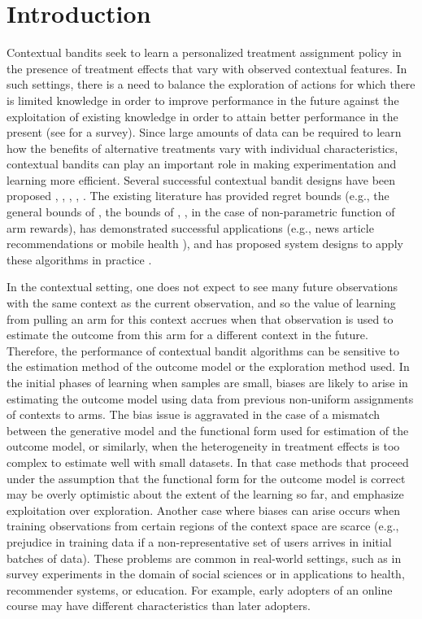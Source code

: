 \documentclass[letterpaper]{article} %
\begin{document}
\section{Introduction}
Contextual bandits seek to learn a personalized treatment assignment policy in the presence of treatment effects that vary with observed contextual features.
In such settings, there is a need to balance the exploration of actions for which there is limited knowledge in order to improve performance in the future against the exploitation of existing knowledge in order to attain better performance in the present (see \cite{bubeck2012regret} for a survey). 
Since large amounts of data can be required to learn how the benefits of alternative treatments vary with individual characteristics, contextual bandits can play an important role in making experimentation and learning more efficient.
Several successful contextual bandit designs have been proposed \cite{auer-linrel}, \cite{li-linucb}, \cite{agrawal-lints}, \cite{agarwal-ilovetoconbandits}, \cite{bastani2015online}. 
The existing literature has provided regret bounds (e.g., the general bounds of \cite{russo-vanroy}, the bounds of  \cite{rigollet-nonparamtheory}, \cite{perchet-nonparamtheory}, \cite{slivkins-nonparamtheory} in the case of non-parametric function of arm rewards), has demonstrated successful applications (e.g., news article recommendations \cite{li-linucb} or mobile health \cite{lei-mhealth}), and has proposed system designs to apply these algorithms in practice \cite{agarwal-debt}.

In the contextual setting, one does not expect to see many future observations with the same context as the current observation, and so the value of learning from pulling an arm for this context accrues when that observation is used to estimate the outcome from this arm for a different context in the future.
Therefore, the performance of contextual bandit algorithms can be sensitive to the estimation method of the outcome model or the exploration method used.  
In the initial phases of learning when samples are small, biases are likely to arise in estimating the outcome model using data from previous non-uniform assignments of contexts to arms.
The bias issue is aggravated in the case of a mismatch between the generative model and the functional form used for estimation of the outcome model, or similarly, when the heterogeneity in treatment effects is too complex to estimate well with small datasets.  In that case methods that proceed under the assumption that the functional form for the outcome model is correct may  be overly optimistic about the extent  of the learning so far, and emphasize exploitation over exploration.
Another case where biases can arise occurs when training observations from certain regions of the context space are scarce (e.g., prejudice in training data if a non-representative set of users arrives in initial batches of data). 
These problems are common in real-world settings, such as in survey experiments in the domain of social sciences or in applications to health, recommender systems, or education.  
For example, early adopters of an online course may have different characteristics than later adopters.  
\end{document}
